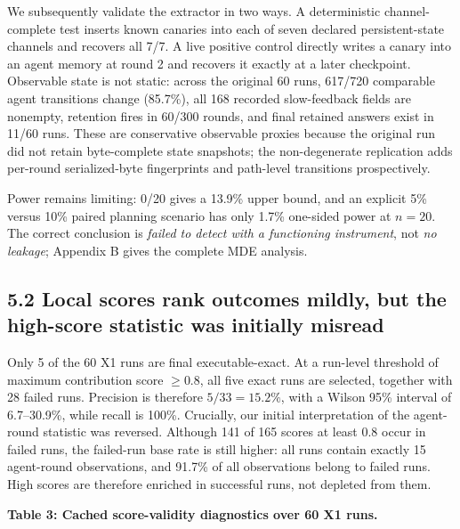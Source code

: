 \documentclass{article}
\begin{document}
We subsequently validate the extractor in two ways. A deterministic channel-complete test inserts known canaries into each of seven declared persistent-state channels and recovers all 7/7. A live positive control directly writes a canary into an agent memory at round 2 and recovers it exactly at a later checkpoint. Observable state is not static: across the original 60 runs, 617/720 comparable agent transitions change (85.7\%), all 168 recorded slow-feedback fields are nonempty, retention fires in 60/300 rounds, and final retained answers exist in 11/60 runs. These are conservative observable proxies because the original run did not retain byte-complete state snapshots; the non-degenerate replication adds per-round serialized-byte fingerprints and path-level transitions prospectively.

Power remains limiting: 0/20 gives a 13.9\% upper bound, and an explicit 5\% versus 10\% paired planning scenario has only 1.7\% one-sided power at \(n=20\). The correct conclusion is \emph{failed to detect with a functioning instrument}, not \emph{no leakage}; Appendix B gives the complete MDE analysis.

\subsection{5.2 Local scores rank outcomes mildly, but the high-score statistic was initially misread}

Only 5 of the 60 X1 runs are final executable-exact. At a run-level threshold of maximum contribution score \(\ge 0.8\), all five exact runs are selected, together with 28 failed runs. Precision is therefore \(5/33=15.2\%\), with a Wilson 95\% interval of 6.7--30.9\%, while recall is 100\%. Crucially, our initial interpretation of the agent-round statistic was reversed. Although 141 of 165 scores at least 0.8 occur in failed runs, the failed-run base rate is still higher: all runs contain exactly 15 agent-round observations, and 91.7\% of all observations belong to failed runs. High scores are therefore enriched in successful runs, not depleted from them.

\textbf{Table 3: Cached score-validity diagnostics over 60 X1 runs.}
\end{document}
